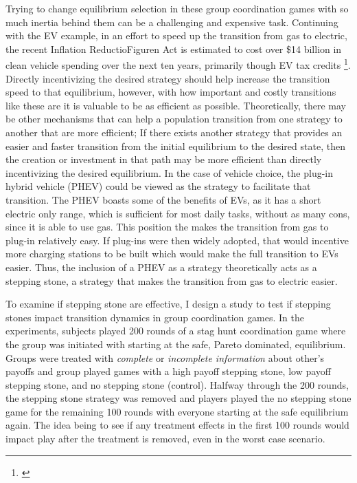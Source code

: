 Trying to change equilibrium selection in these group coordination games with so much inertia behind them can be a challenging and expensive task. Continuing with the EV example, in an effort to speed up the transition from gas to electric, the recent Inflation ReductioFiguren Act is estimated to cost over \$14 billion in clean vehicle spending over the next ten years, primarily though EV tax credits \footnote{\cite{cbo_report}}. Directly incentivizing the desired strategy should help increase the transition speed to that equilibrium, however, with how important and costly transitions like these are it is valuable to be as efficient as possible. Theoretically, there may be other mechanisms that can help a population transition from one strategy to another that are more efficient; If there exists another strategy that provides an easier and faster transition from the initial equilibrium to the desired state, then the creation or investment in that path may be more efficient than directly incentivizing the desired equilibrium. In the case of vehicle choice, the plug-in hybrid vehicle (PHEV) could be viewed as the strategy to facilitate that transition. The PHEV boasts some of the benefits of EVs, as it has a short electric only range, which is sufficient for most daily tasks, without as many cons, since it is able to use gas. This position the makes the transition from gas to plug-in relatively easy. If plug-ins were then widely adopted, that would incentive more charging stations to be built which would make the full transition to EVs easier. Thus, the inclusion of a PHEV as a strategy theoretically acts as a stepping stone, a strategy that makes the transition from gas to electric easier.

To examine if stepping stone are effective, I design a study to test if stepping stones impact transition dynamics in group coordination games. In the experiments, subjects played 200 rounds of a stag hunt coordination game where the group was initiated with starting at the safe, Pareto dominated, equilibrium. Groups were treated with \textit{complete} or \textit{incomplete information} about other's payoffs and group played games with a high payoff stepping stone, low payoff stepping stone, and no stepping stone (control). Halfway through the 200 rounds, the stepping stone strategy was removed and players played the no stepping stone game for the remaining 100 rounds with everyone starting at the safe equilibrium again. The idea being to see if any treatment effects in the first 100 rounds would impact play after the treatment is removed, even in the worst case scenario. 

